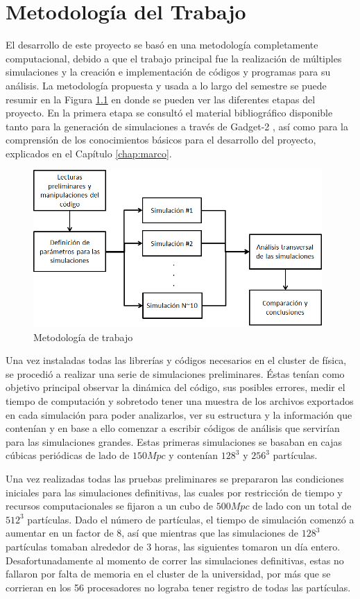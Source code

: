 \chapter{Metodología del Trabajo}
\label{chap:metodologia}
El desarrollo de este proyecto se basó en una metodología completamente computacional, debido a que el trabajo principal fue la realización de múltiples simulaciones y la creación e implementación de códigos y programas para su análisis. La metodología propuesta y usada a lo largo del semestre se puede resumir en la Figura \ref{fig:meto} en donde se pueden ver las diferentes etapas del proyecto. En la primera etapa se consultó el material bibliográfico disponible tanto para la generación de simulaciones a través de Gadget-2 \cite{gadget}, así como para la comprensión de los conocimientos básicos para el desarrollo del proyecto, explicados en el Capítulo \ref{chap:marco}. 

\begin{figure}[H]
	\centering
	\includegraphics[width=11cm]{Metodologia/metodologia.png}
	\caption{Metodología de trabajo}
	\label{fig:meto}
\end{figure}

Una vez instaladas todas las librerías y códigos necesarios en el cluster de física, se procedió a realizar una serie de simulaciones preliminares. Éstas tenían como objetivo principal observar la dinámica del código, sus posibles errores, medir el tiempo de computación y sobretodo tener una muestra de los archivos exportados en cada simulación para poder analizarlos, ver su estructura y la información que contenían y en base a ello comenzar a escribir códigos de análisis que servirían para las simulaciones grandes. Estas primeras simulaciones se basaban en cajas cúbicas periódicas de lado de $150Mpc$ y contenían $128^3$ y $256^3$ partículas.

Una vez realizadas todas las pruebas preliminares se prepararon las condiciones iniciales para las simulaciones definitivas, las cuales por restricción de tiempo y recursos computacionales se fijaron a un cubo de $500Mpc$ de lado con un total de $512^3$ partículas. Dado el número de partículas, el tiempo de simulación comenzó a aumentar en un factor de 8, así que mientras que las simulaciones de $128^3$ partículas tomaban alrededor de 3 horas, las siguientes tomaron un día entero. Desafortunadamente al momento de correr las simulaciones definitivas, estas no fallaron por falta de memoria en el cluster de la universidad, por más que se corrieran en los 56 procesadores no lograba tener registro de todas las partículas. 


